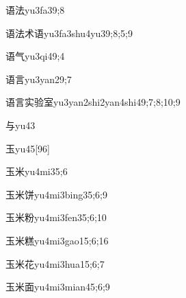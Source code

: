 \begin{verbete}{语法}{yu3fa3}{9;8}
\end{verbete}

\begin{verbete}{语法术语}{yu3fa3shu4yu3}{9;8;5;9}
\end{verbete}

\begin{verbete}{语气}{yu3qi4}{9;4}
\end{verbete}

\begin{verbete}{语言}{yu3yan2}{9;7}
\end{verbete}

\begin{verbete}{语言实验室}{yu3yan2shi2yan4shi4}{9;7;8;10;9}
\end{verbete}

\begin{verbete}{与}{yu4}{3}
\end{verbete}

\begin{verbete}{玉}{yu4}{5}[96]
\end{verbete}

\begin{verbete}{玉米}{yu4mi3}{5;6}
\end{verbete}

\begin{verbete}{玉米饼}{yu4mi3bing3}{5;6;9}
\end{verbete}

\begin{verbete}{玉米粉}{yu4mi3fen3}{5;6;10}
\end{verbete}

\begin{verbete}{玉米糕}{yu4mi3gao1}{5;6;16}
\end{verbete}

\begin{verbete}{玉米花}{yu4mi3hua1}{5;6;7}
\end{verbete}

\begin{verbete}{玉米面}{yu4mi3mian4}{5;6;9}
\end{verbete}

